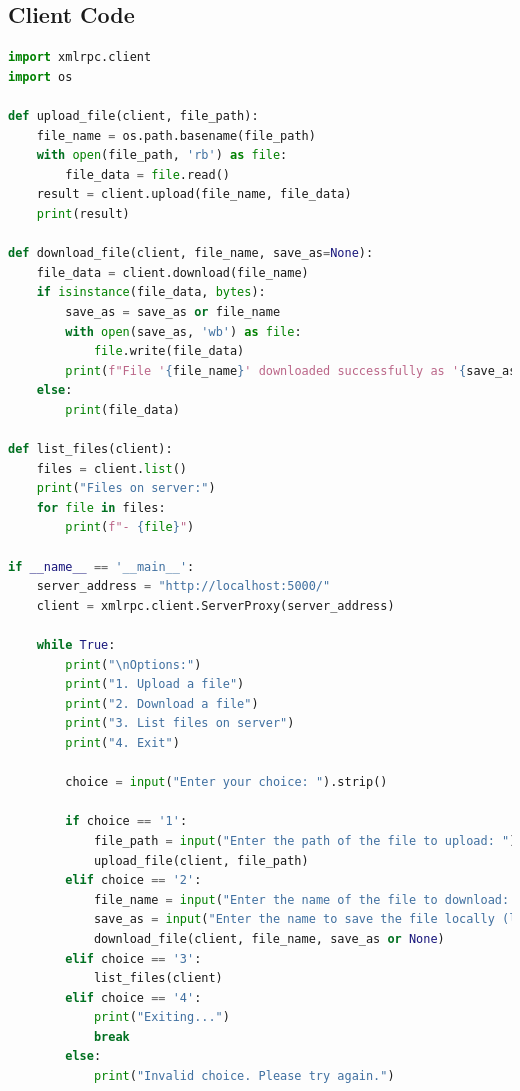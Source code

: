 \documentclass[12pt,a4paper]{article}
\begin{document}
\subsection*{Client Code}
\begin{lstlisting}[language=Python, caption=Client Code]
import xmlrpc.client
import os

def upload_file(client, file_path):
    file_name = os.path.basename(file_path)
    with open(file_path, 'rb') as file:
        file_data = file.read()
    result = client.upload(file_name, file_data)
    print(result)

def download_file(client, file_name, save_as=None):
    file_data = client.download(file_name)
    if isinstance(file_data, bytes):
        save_as = save_as or file_name
        with open(save_as, 'wb') as file:
            file.write(file_data)
        print(f"File '{file_name}' downloaded successfully as '{save_as}'.")
    else:
        print(file_data)

def list_files(client):
    files = client.list()
    print("Files on server:")
    for file in files:
        print(f"- {file}")

if __name__ == '__main__':
    server_address = "http://localhost:5000/"
    client = xmlrpc.client.ServerProxy(server_address)

    while True:
        print("\nOptions:")
        print("1. Upload a file")
        print("2. Download a file")
        print("3. List files on server")
        print("4. Exit")

        choice = input("Enter your choice: ").strip()
        
        if choice == '1':
            file_path = input("Enter the path of the file to upload: ").strip()
            upload_file(client, file_path)
        elif choice == '2':
            file_name = input("Enter the name of the file to download: ").strip()
            save_as = input("Enter the name to save the file locally (leave blank to use original name): ").strip()
            download_file(client, file_name, save_as or None)
        elif choice == '3':
            list_files(client)
        elif choice == '4':
            print("Exiting...")
            break
        else:
            print("Invalid choice. Please try again.")

\end{lstlisting}
\end{document}
